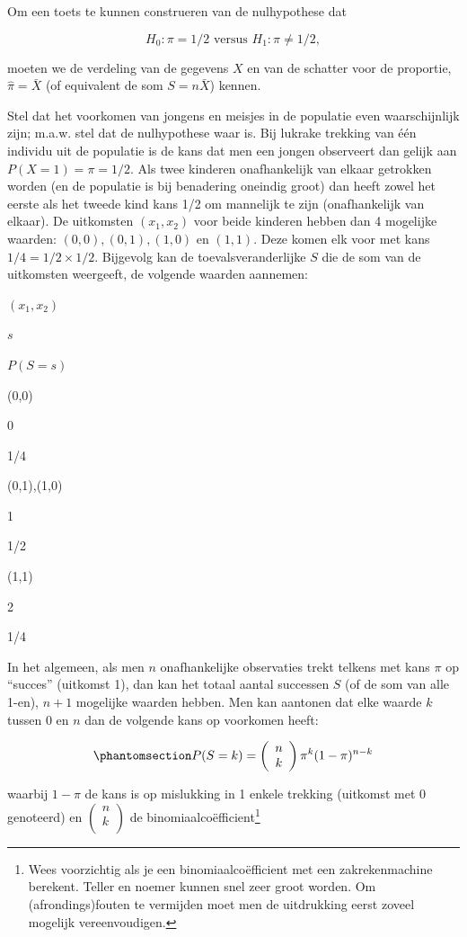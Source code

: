 \documentclass[
  dutch,
  letterpaper,
  12pt]{book}
\theoremstyle{definition}
\theoremstyle{definition}
\theoremstyle{definition}
\theoremstyle{remark}
\begin{document}
Om een toets te kunnen construeren van de nulhypothese dat

\[H_0: \pi=1/2 \text{ versus } H_1: \pi\neq 1/2,\]

moeten we de verdeling van de gegevens \(X\) en van de schatter voor de
proportie, \(\hat \pi = \bar X\) (of equivalent de som \(S=n\bar X\))
kennen.

Stel dat het voorkomen van jongens en meisjes in de populatie even
waarschijnlijk zijn; m.a.w. stel dat de nulhypothese waar is. Bij
lukrake trekking van één individu uit de populatie is de kans dat men
een jongen observeert dan gelijk aan \(P(X=1) = \pi = 1/2.\) Als twee
kinderen onafhankelijk van elkaar getrokken worden (en de populatie is
bij benadering oneindig groot) dan heeft zowel het eerste als het tweede
kind kans 1/2 om mannelijk te zijn (onafhankelijk van elkaar). De
uitkomsten \((x_1, x_2)\) voor beide kinderen hebben dan 4 mogelijke
waarden: \((0,0), (0,1),(1,0)\) en \((1,1).\) Deze komen elk voor met
kans \(1/4 = 1/2 \times 1/2\). Bijgevolg kan de toevalsveranderlijke
\(S\) die de som van de uitkomsten weergeeft, de volgende waarden
aannemen:

\((x_1,x_2)\)

\(s\)

\(P(S=s)\)

(0,0)

0

1/4

(0,1),(1,0)

1

1/2

(1,1)

2

1/4

In het algemeen, als men \(n\) onafhankelijke observaties trekt telkens
met kans \(\pi\) op ``succes'' (uitkomst 1), dan kan het totaal aantal
successen \(S\) (of de som van alle 1-en), \(n+1\) mogelijke waarden
hebben. Men kan aantonen dat elke waarde \(k\) tussen 0 en \(n\) dan de
volgende kans op voorkomen heeft:

\begin{equation}\protect\phantomsection\label{eq-binomk}{
P(S=k) = \left (
\begin{array}{c}
n \\
k \\
\end{array}
\right ) \pi^k (1-\pi)^{n-k}
}\end{equation}

waarbij \(1-\pi\) de kans is op mislukking in 1 enkele trekking
(uitkomst met 0 genoteerd) en \(\left(\begin{array}{c}
n \\
k \\
\end{array}\right)\) de binomiaalcoëfficient\footnote{Wees voorzichtig
  als je een binomiaalcoëfficient met een zakrekenmachine berekent.
  Teller en noemer kunnen snel zeer groot worden. Om (afrondings)fouten
  te vermijden moet men de uitdrukking eerst zoveel mogelijk
  vereenvoudigen.}
\end{document}
